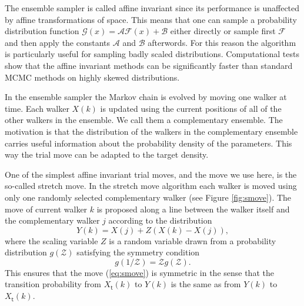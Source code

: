 \documentclass{wihuri}
\def\be{\begin{equation}}
\def\ee{\end{equation}}
\def\tstep{\mathsf{t}}
\begin{document}


The ensemble sampler is called affine invariant since its performance is unaffected by affine transformations of space. This means that one can sample a probability distribution function $\mathcal{G}(x) = \mathcal{A}\mathcal{F}(x) + \mathcal{B}$ either directly or sample first $\mathcal{F}$ and then apply the constants $\mathcal{A}$ and $\mathcal{B}$ afterwords. 
For this reason the algorithm is particularly useful for sampling badly scaled distributions. Computational tests show that the affine invariant methods can be significantly faster than standard MCMC methods on highly skewed distributions.

In the ensemble sampler the  Markov chain is evolved by moving one walker at time. Each walker $X(k)$ is updated using the current positions of all of the other walkers in
the ensemble. We call them a complementary ensemble. The motivation is that the distribution of the walkers in the complementary ensemble carries useful information about the probability density of the parameters. This way the trial move can be adapted to the target density.  





One of the simplest affine invariant trial moves, and the move we use here, is the so-called stretch move. In the stretch move algorithm each walker is moved using only one randomly selected complementary walker (see Figure \ref{fig:smove}). The move of current walker $k$ is proposed along a line between the walker itself and the complementary walker $j$ according to the distribution \cite{emceehammer}
\be \label{eq:smove}
Y(k) = X(j) + Z(X(k)-X(j)),
\ee
where the scaling variable $Z$ is a random variable drawn from a probability distribution $g(\mathcal{Z})$ satisfying the symmetry condition
\be \label{eq:symmetry_condition}
g(1/\mathcal{Z}) = \mathcal{Z}g(\mathcal{Z}).
\ee
This ensures that the move (\ref{eq:smove}) is symmetric in the sense that the transition probability from $X_{\tstep}(k)$ to $Y(k)$ is the same as from $Y(k)$ to $X_{\tstep}(k)$. %
\end{document}
